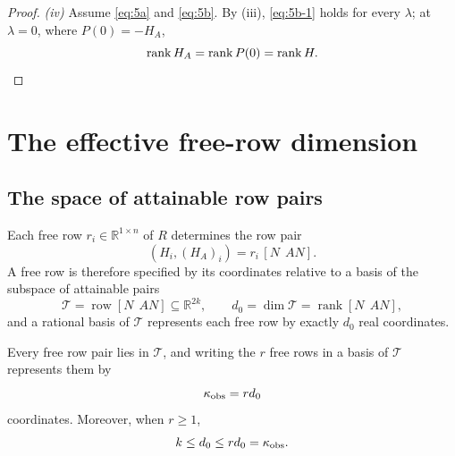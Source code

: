 \begin{proof}
\emph{(iv)} Assume \eqref{eq:5a} and \eqref{eq:5b}. By (iii), \eqref{eq:5b-1} holds for every $\lambda$; at $\lambda=0$, where $P(0)=-H_A$,
\begin{equation*}
\operatorname{rank}H_A=\operatorname{rank}P(0)=\operatorname{rank}H . \qedhere
\end{equation*}
\end{proof}

\section{The effective free-row dimension}\label{sec:dimension}

\subsection{The space of attainable row pairs}\label{sec:free}

Each free row $r_i\in\mathbb R^{1\times n}$ of $R$ determines the row pair
\begin{equation*}
(H_i,(H_A)_i)=r_i\,[N\ \ AN].
\end{equation*}
A free row is therefore specified by its coordinates relative to a basis of the subspace of attainable pairs
\begin{equation*}
\mathcal T=\operatorname{row}[N\ \ AN]\subseteq\mathbb R^{2k},\qquad
d_0=\dim\mathcal T=\operatorname{rank}[N\ \ AN],
\end{equation*}
and a rational basis of $\mathcal T$ represents each free row by exactly $d_0$ real coordinates.

\begin{lem}\label{lem:attainable}
Every free row pair lies in $\mathcal T$, and writing the $r$ free rows in a basis of $\mathcal T$ represents them by
\begin{equation}\label{eq:kappa}
\kappa_{\rm obs}=r d_0
\end{equation}
coordinates. Moreover, when $r\ge1$,
\begin{equation}\label{lem3-2}
k\le d_0\le rd_0=\kappa_{\rm obs}.
\end{equation}
\end{lem}

